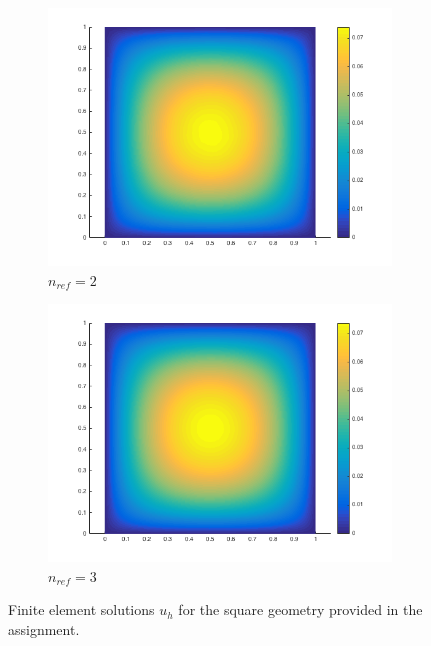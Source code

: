 \documentclass[10pt]{article}
\begin{document}
\begin{figure}[H]
\begin{subfigure}[b]{0.45\textwidth}
                \centering
                \includegraphics[width=\textwidth]{square2.png}
                \caption{\(n_{ref}=2\)}
        \end{subfigure}%
                \begin{subfigure}[b]{0.45\textwidth}
                \centering
                \includegraphics[width=\textwidth]{square3.png}
                \caption{\(n_{ref}=3\)}
        \end{subfigure}%
        \caption{Finite element solutions \(u_h\) for the square geometry provided in the assignment.}
        \label{fig:30}
\end{figure}
\end{document}

